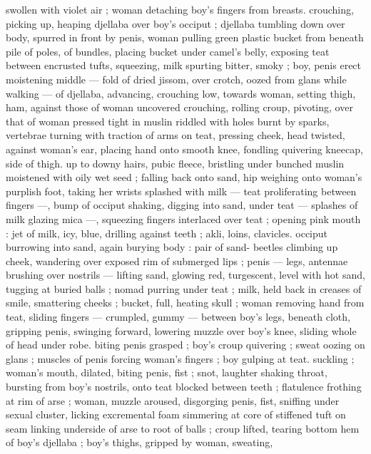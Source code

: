 swollen with violet air ; woman detaching boy's fingers from breasts. 
crouching, picking up, heaping djellaba over boy's occiput ; djellaba 
tumbling down over body, spurred in front by penis, woman pulling 
green plastic bucket from beneath pile of poles, of bundles, placing 
bucket under camel's belly, exposing teat between encrusted tufts, 
squeezing, milk spurting bitter, smoky ; boy, penis erect moistening 
middle --- fold of dried jissom, over crotch, oozed from glans while 
walking --- of djellaba, advancing, crouching low, towards woman, 
setting thigh, ham, against those of woman uncovered crouching, 
rolling croup, pivoting, over that of woman pressed tight in muslin 
riddled with holes burnt by sparks, vertebrae turning with traction of 
arms on teat, pressing cheek, head twisted, against woman's ear, 
placing hand onto smooth knee, fondling quivering kneecap, side of 
thigh. up to downy hairs, pubic fleece, bristling under bunched 
muslin moistened with oily wet seed ; falling back onto sand, hip 
weighing onto woman's purplish foot, taking her wrists splashed with 
milk --- teat proliferating between fingers ---, bump of occiput 
shaking, digging into sand, under teat --- splashes of milk glazing 
mica ---, squeezing fingers interlaced over teat ; opening pink mouth 
: jet of milk, icy, blue, drilling against teeth ; akli, loins, clavicles. 
occiput burrowing into sand, again burying body : pair of sand- 
beetles climbing up cheek, wandering over exposed rim of 
submerged lips ; penis --- legs, antennae brushing over nostrils --- 
lifting sand, glowing red, turgescent, level with hot sand, tugging at 
buried balls ; nomad purring under teat ; milk, held back in creases 
of smile, smattering cheeks ; bucket, full, heating skull ; woman 
removing hand from teat, sliding fingers --- crumpled, gummy --- 
between boy's legs, beneath cloth, gripping penis, swinging forward, 
lowering muzzle over boy's knee, sliding whole of head under robe. 
biting penis grasped ; boy's croup quivering ; sweat oozing on glans 
; muscles of penis forcing woman's fingers ; boy gulping at teat. 
suckling ; woman's mouth, dilated, biting penis, fist ; snot, laughter 
shaking throat, bursting from boy's nostrils, onto teat blocked 
between teeth ; flatulence frothing at rim of arse ; woman, muzzle 
aroused, disgorging penis, fist, sniffing under sexual cluster, licking 
excremental foam simmering at core of stiffened tuft on seam linking 
underside of arse to root of balls ; croup lifted, tearing bottom hem 
of boy's djellaba ; boy's thighs, gripped by woman, sweating, 
